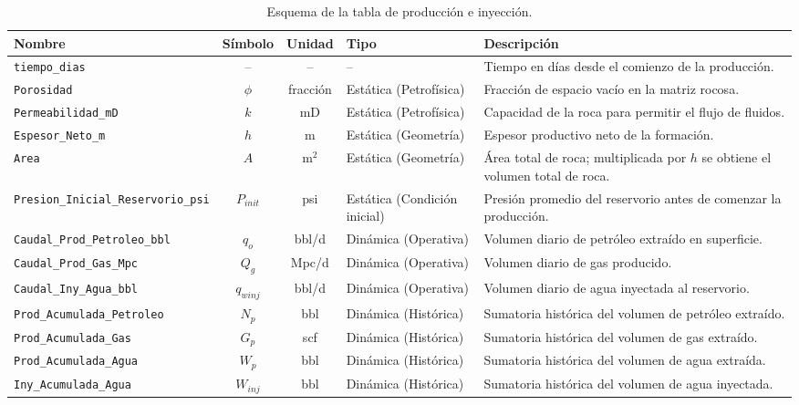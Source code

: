 \documentclass[12pt,a4paper]{article}
\begin{document}
\begin{table}[H]
\centering
\footnotesize
\begin{tabular}{|l|c|c|l|p{4.5cm}|}
  \hline
  \textbf{Nombre} & \textbf{Símbolo} & \textbf{Unidad} & \textbf{Tipo} & \textbf{Descripción} \\
  \hline
  \texttt{tiempo\_dias} & -- & -- & -- & Tiempo en días desde el comienzo de la producción. \\
  \hline
  \texttt{Porosidad} & $\phi$ & fracción & Estática (Petrofísica) & Fracción de espacio vacío en la matriz rocosa. \\
  \hline
  \texttt{Permeabilidad\_mD} & $k$ & mD & Estática (Petrofísica) & Capacidad de la roca para permitir el flujo de fluidos. \\
  \hline
  \texttt{Espesor\_Neto\_m} & $h$ & m & Estática (Geometría) & Espesor productivo neto de la formación. \\
  \hline
  \texttt{Area} & $A$ & m$^2$ & Estática (Geometría) & Área total de roca; multiplicada por $h$ se obtiene el volumen total de roca. \\
  \hline
  \texttt{Presion\_Inicial\_Reservorio\_psi} & $P_{init}$ & psi & Estática (Condición inicial) & Presión promedio del reservorio antes de comenzar la producción. \\
  \hline
  \texttt{Caudal\_Prod\_Petroleo\_bbl} & $q_o$ & bbl/d & Dinámica (Operativa) & Volumen diario de petróleo extraído en superficie. \\
  \hline
  \texttt{Caudal\_Prod\_Gas\_Mpc} & $Q_g$ & Mpc/d & Dinámica (Operativa) & Volumen diario de gas producido. \\
  \hline
  \texttt{Caudal\_Iny\_Agua\_bbl} & $q_{winj}$ & bbl/d & Dinámica (Operativa) & Volumen diario de agua inyectada al reservorio. \\
  \hline
  \texttt{Prod\_Acumulada\_Petroleo} & $N_p$ & bbl & Dinámica (Histórica) & Sumatoria histórica del volumen de petróleo extraído. \\
  \hline
  \texttt{Prod\_Acumulada\_Gas} & $G_p$ & scf & Dinámica (Histórica) & Sumatoria histórica del volumen de gas extraído. \\
  \hline
  \texttt{Prod\_Acumulada\_Agua} & $W_p$ & bbl & Dinámica (Histórica) & Sumatoria histórica del volumen de agua extraída. \\
  \hline
  \texttt{Iny\_Acumulada\_Agua} & $W_{inj}$ & bbl & Dinámica (Histórica) & Sumatoria histórica del volumen de agua inyectada. \\
  \hline
\end{tabular}
\caption{Esquema de la tabla de producción e inyección.}
\label{tab:dataset-produccion}
\end{table}
\end{document}
